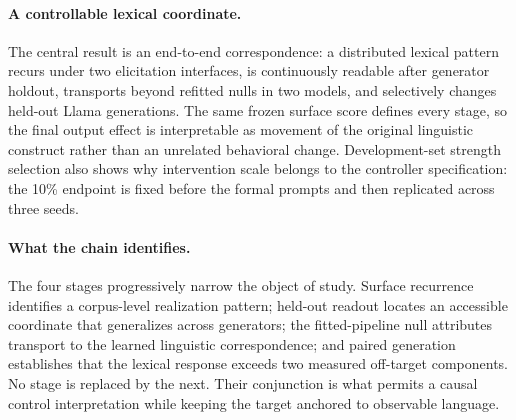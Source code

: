 \paragraph{A controllable lexical coordinate.} The central result is an end-to-end correspondence: a distributed lexical pattern recurs under two elicitation interfaces, is continuously readable after generator holdout, transports beyond refitted nulls in two models, and selectively changes held-out Llama generations. The same frozen surface score defines every stage, so the final output effect is interpretable as movement of the original linguistic construct rather than an unrelated behavioral change. Development-set strength selection also shows why intervention scale belongs to the controller specification: the 10\% endpoint is fixed before the formal prompts and then replicated across three seeds.

\paragraph{What the chain identifies.} The four stages progressively narrow the object of study. Surface recurrence identifies a corpus-level realization pattern; held-out readout locates an accessible coordinate that generalizes across generators; the fitted-pipeline null attributes transport to the learned linguistic correspondence; and paired generation establishes that the lexical response exceeds two measured off-target components. No stage is replaced by the next. Their conjunction is what permits a causal control interpretation while keeping the target anchored to observable language.


